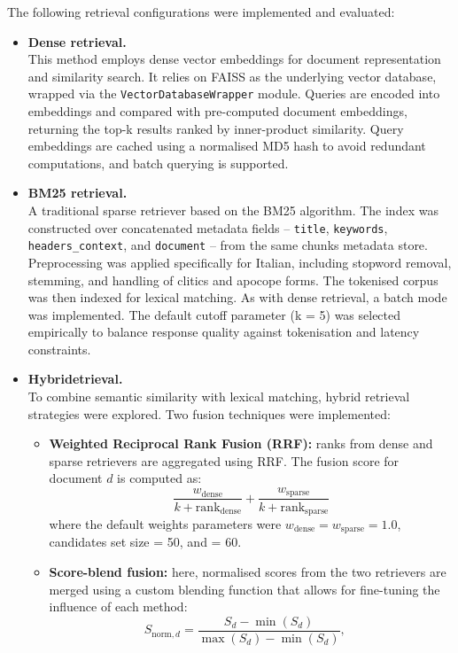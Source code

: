 \begin{spacing}{1.5}
The following retrieval configurations were implemented and evaluated:
\begin{itemize}
    \item \textbf{Dense retrieval.}\\
    This method employs dense vector embeddings for document representation and similarity search. It relies on FAISS as the underlying vector database, wrapped via the \texttt{VectorDatabaseWrapper} module. Queries are encoded into embeddings and compared with pre-computed document embeddings, returning the top-k results ranked by inner-product similarity. Query embeddings are cached using a normalised MD5 hash to avoid redundant computations, and batch querying is supported.
    \item \textbf{BM25 retrieval.}\\ 
    A traditional sparse retriever based on the BM25 algorithm. The index was constructed over concatenated metadata fields -- \texttt{title}, \texttt{keywords}, \texttt{headers\_context}, and \texttt{document} -- from the same chunks metadata store. Preprocessing was applied specifically for Italian, including stopword removal, stemming, and handling of clitics and apocope forms. The tokenised corpus was then indexed for lexical matching. As with dense retrieval, a batch mode was implemented. The default cutoff parameter (k = 5) was selected empirically to balance response quality against tokenisation and latency constraints.
    \item \textbf{Hybridetrieval.}\\ 
    To combine semantic similarity with lexical matching, hybrid retrieval strategies were explored. Two fusion techniques were implemented:
    \begin{itemize}
            \item \textbf{Weighted Reciprocal Rank Fusion (RRF):} ranks from dense and sparse retrievers are aggregated using RRF. The fusion score for document $d$ is computed as:
\[
\frac{w_\mathrm{dense}}{k + \mathrm{rank}_\mathrm{dense}} + \frac{w_\mathrm{sparse}}{k + \mathrm{rank}_\mathrm{sparse}}
\]
where the default weights parameters were $w_{\text{dense}} = w_{\text{sparse}} = 1.0$, candidates set size = 50, and  = 60.
            \item \textbf{Score-blend fusion:} here, normalised scores from the two retrievers are merged using a custom blending function that allows for fine-tuning the influence of each method:
\[
S_{\text{norm},d} = \frac{S_d - \min(S_d)}{\max(S_d) - \min(S_d)}, \quad  
\]
\end{itemize}
\end{itemize}
\end{spacing}
